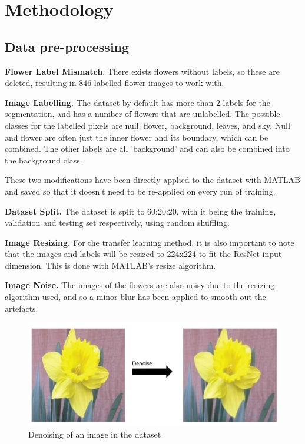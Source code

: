 \documentclass{article}
\begin{document}
\section{Methodology}


\subsection{Data pre-processing}

\textbf{Flower Label Mismatch}. There exists flowers without labels, so these are deleted, resulting in 846 labelled flower images to work with.

\textbf{Image Labelling.}  The dataset by default has more than 2 labels for the segmentation, and has a number of flowers that are unlabelled. The possible classes for the labelled pixels are null, flower, background, leaves, and sky. Null and flower are often just the inner flower and its boundary, which can be combined. The other labels are all 'background' and can also be combined into the background class. 

These two modifications have been directly applied to the dataset with MATLAB and saved so that it doesn't need to be re-applied on every run of training.

\textbf{Dataset Split.} The dataset is split to 60:20:20, with it being the training, validation and testing set respectively, using random shuffling.

\textbf{Image Resizing.} For the transfer learning method, it is also important to note that the images and labels will be resized to 224x224 to fit the ResNet input dimension. This is done with MATLAB's resize algorithm.

\textbf{Image Noise.} The images of the flowers are also noisy due to the resizing algorithm used, and so a minor blur has been applied to smooth out the artefacts. 

\begin{figure}[H]
    \centering
    \includegraphics[width=\linewidth]{denoise.png}
    \caption{Denoising of an image in the dataset}
    \label{fig:enter-label}
\end{figure}
\end{document}
